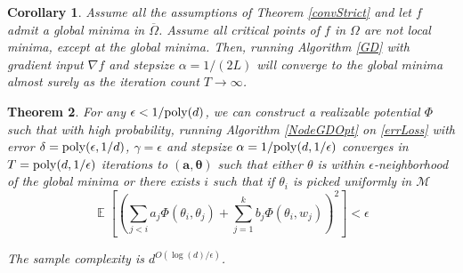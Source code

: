 \documentclass{article}
\newtheorem{theorem}{Theorem}[section]
\newtheorem{corollary}[theorem]{Corollary}
\DeclareMathOperator*{\expt}{\mathbb{E}}
\begin{document}
\begin{corollary}
Assume all the assumptions of Theorem \ref{convStrict} and let $f$ admit a global minima in $\overline{\Omega}$. Assume all critical points of $f$ in $\Omega$ are not local minima, except at the global minima. Then, running Algorithm \ref{GD} with gradient input $\nabla f$ and stepsize $\alpha = 1/(2L)$ will converge to the global minima almost surely as the iteration count $T \to\infty$.
\end{corollary}
\fi


\begin{theorem}
For any $\epsilon < 1/\mathrm{poly}(d)$, we can construct a realizable potential $\Phi$ such that with high probability, running Algorithm \ref{NodeGDOpt} on \eqref{errLoss} with error $\delta = \mathrm{poly}(\epsilon,1/d)$, $\gamma = \epsilon$ and stepsize $\alpha = 1/\mathrm{poly}(d,1/\epsilon)$ converges in $T = \mathrm{poly}(d, 1/\epsilon)$ iterations to $(\boldsymbol{a,\theta})$ such that either  $\theta$ is within $\epsilon$-neighborhood of the global minima or there exists $i$ such that if $\theta_i$ is picked uniformly in $\mathcal{M}$
%
\[ \expt\left[\left( \sum_{j < i} a_j \Phi(\theta_i,\theta_j) + \sum_{j=1}^k b_j \Phi(\theta_i,w_j)\right)^2\right] < \epsilon\]

The sample complexity is $d^{O(\log(d)/\epsilon)}$.
\end{theorem}
\end{document}
